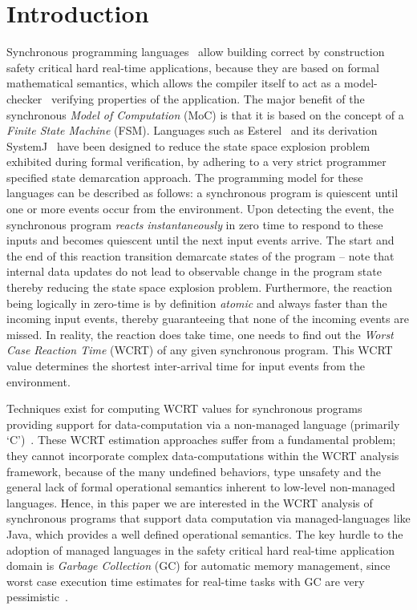 \section{Introduction}
\label{sec:introduction}

Synchronous programming languages~\cite{berry92} allow building correct
by construction safety critical hard real-time applications, because
they are based on formal mathematical semantics, which allows the
compiler itself to act as a model-checker~\cite{jagadeesan1995safety}
verifying properties of the application. The major benefit of the
synchronous \textit{Model of Computation} (MoC) is that it is based on
the concept of a \textit{Finite State Machine} (FSM). Languages such as
Esterel~\cite{berry92} and its derivation SystemJ~\cite{amal10} have
been designed to reduce the state space explosion problem exhibited
during formal verification, by adhering to a very strict programmer
specified state demarcation approach. The programming model for these
languages can be described as follows: a synchronous program is
quiescent until one or more events occur from the environment. Upon
detecting the event, the synchronous program \textit{reacts}
\textit{instantaneously} in zero time to respond to these inputs and
becomes quiescent until the next input events arrive. The start and the
end of this reaction transition demarcate states of the program -- note
that internal data updates do not lead to {\color{red} observable}
change in the program state thereby reducing the state space explosion
problem. Furthermore, the reaction being logically in zero-time is by
definition \textit{atomic} and always faster than the incoming input
events, thereby guaranteeing that none of the incoming events are
missed. In reality, the reaction does take time, one needs to find out
the \textit{Worst Case Reaction Time} (WCRT) of any given synchronous
program. This WCRT value determines the shortest inter-arrival time for
input events from the environment.

Techniques exist for computing WCRT values for synchronous programs
providing support for data-computation via a non-managed language
(primarily `C')~\cite{boldt07,proop10}. These WCRT estimation approaches
suffer from a fundamental problem; they cannot incorporate complex
data-computations within the WCRT analysis framework, because of the
many undefined behaviors, type unsafety and the general lack of formal
operational semantics inherent to low-level non-managed
languages. Hence, in this paper we are interested in the WCRT analysis
of synchronous programs that support data computation via
managed-languages like Java, which provides a well defined operational
semantics. The key hurdle to the adoption of managed languages in the
safety critical hard real-time application domain is \textit{Garbage
  Collection} (GC) for automatic memory management, since worst case
execution time estimates for real-time tasks with GC are very
pessimistic~\cite{puffitsch2013design}.


